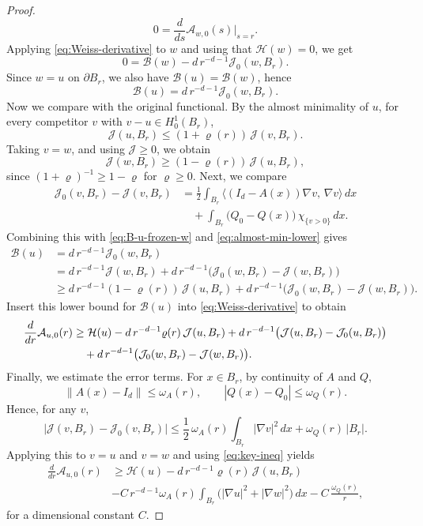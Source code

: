 \documentclass[10pt,a4paper]{amsart}
\begin{document}
\begin{proof}
\[
    0 = \frac{d}{ds}\mathcal A_{w,0}(s)\Big|_{s=r}.
\]
Applying \eqref{eq:Weiss-derivative} to $w$ and using that $\mathcal H(w) = 0$, we get
\[
    0 = \mathcal B(w)-d\,r^{-d-1}\mathcal J_0(w,B_r).
\]
Since $w=u$ on $\partial B_r$, we also have $\mathcal B(u)=\mathcal B(w)$, hence
\begin{equation}\label{eq:B-u-frozen-w}
\mathcal B(u)=d\,r^{-d-1}\mathcal J_0(w,B_r).
\end{equation}
Now we compare with the original functional. By the almost minimality of $u$, for every competitor $v$ with $v-u\in H^1_0(B_r)$,
\[
	\mathcal J(u,B_r)\le (1+\varrho(r))\,\mathcal J(v,B_r).
\]
Taking $v=w$, and using $\mathcal J\ge 0$, we obtain
\begin{equation}\label{eq:almost-min-lower}
	\mathcal J(w,B_r)\ge (1-\varrho(r))\,\mathcal J(u,B_r),
\end{equation}
since $(1+\varrho)^{-1}\ge 1-\varrho$ for $\varrho\ge 0$. Next, we compare 
\[
\begin{aligned}
	\mathcal J_0(v,B_r)-\mathcal J(v,B_r)
	&=\frac12\int_{B_r}\big\langle (I_d-A(x))\nabla v,\,\nabla v\big\rangle\,dx \\
	&\quad +\int_{B_r}\big(Q_0-Q(x)\big)\,\chi_{\{v>0\}}\,dx.
\end{aligned}
\]
Combining this with \eqref{eq:B-u-frozen-w} and \eqref{eq:almost-min-lower} gives
\begin{align*}
	\mathcal B(u)
	&= d\,r^{-d-1}\mathcal J_0(w,B_r) \\
	&= d\,r^{-d-1}\mathcal J(w,B_r)
	+d\,r^{-d-1}\big(\mathcal J_0(w,B_r)-\mathcal J(w,B_r)\big)\\
	&\ge d\,r^{-d-1}(1-\varrho(r))\,\mathcal J(u,B_r)
	+d\,r^{-d-1}\big(\mathcal J_0(w,B_r)-\mathcal J(w,B_r)\big).
\end{align*}
Insert this lower bound for $\mathcal B(u)$ into \eqref{eq:Weiss-derivative} to obtain
\begin{align}
\frac{d}{dr}\mathcal A_{u,0}(r)
&\ge \mathcal H(u)
-d\,r^{-d-1}\varrho(r)\,\mathcal J(u,B_r)
+d\,r^{-d-1}\big(\mathcal J(u,B_r)-\mathcal J_0(u,B_r)\big)\notag\\
&\quad +d\,r^{-d-1}\big(\mathcal J_0(w,B_r)-\mathcal J(w,B_r)\big). \label{eq:key-ineq}
\end{align}
Finally, we estimate the error terms. For $x\in B_r$, by continuity of $A$ and $Q$,
\[
\|A(x)-I_d\|\le \omega_A(r),
\qquad
|Q(x)-Q_0|\le \omega_Q(r).
\]
Hence, for any $v$,
\[
\big|\mathcal J(v,B_r)-\mathcal J_0(v,B_r)\big|
\le \frac12\,\omega_A(r)\int_{B_r}|\nabla v|^2\,dx + \omega_Q(r)\,|B_r|.
\]
Applying this to $v=u$ and $v=w$ and using \eqref{eq:key-ineq} yields
\begin{align*}
\frac{d}{dr}\mathcal A_{u,0}(r)
&\ge \mathcal H(u)
-d\,r^{-d-1}\varrho(r)\,\mathcal J(u,B_r)\\
& - C\,r^{-d-1}\omega_A(r)\!\int_{B_r}\big(|\nabla u|^2+|\nabla w|^2\big)\,dx
- C\,\frac{\omega_Q(r)}{r},
\end{align*}
for a dimensional constant $C$.


\end{proof}
\end{document}
